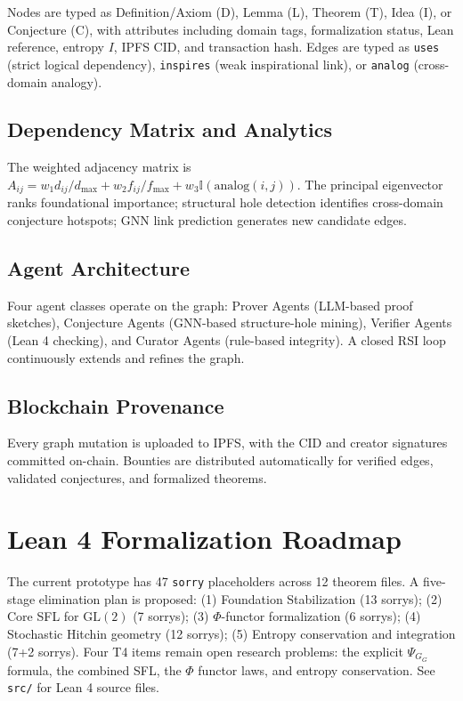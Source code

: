 \documentclass[11pt,a4paper]{article}
\theoremstyle{definition}
\newcommand{\GL}{\mathrm{GL}}
\newcommand{\PSI}{\Psi_G}
\begin{document}
Nodes are typed as Definition/Axiom (D), Lemma (L), Theorem (T), Idea (I), or Conjecture (C), with attributes including domain tags, formalization status, Lean reference, entropy $I$, IPFS CID, and transaction hash. Edges are typed as \texttt{uses} (strict logical dependency), \texttt{inspires} (weak inspirational link), or \texttt{analog} (cross-domain analogy).

\subsection{Dependency Matrix and Analytics}

The weighted adjacency matrix is $A_{ij} = w_1 d_{ij}/d_{\max} + w_2 f_{ij}/f_{\max} + w_3 \mathbb{I}(\mathrm{analog}(i,j))$. The principal eigenvector ranks foundational importance; structural hole detection identifies cross-domain conjecture hotspots; GNN link prediction generates new candidate edges.

\subsection{Agent Architecture}

Four agent classes operate on the graph: Prover Agents (LLM-based proof sketches), Conjecture Agents (GNN-based structure-hole mining), Verifier Agents (Lean 4 checking), and Curator Agents (rule-based integrity). A closed RSI loop continuously extends and refines the graph.

\subsection{Blockchain Provenance}

Every graph mutation is uploaded to IPFS, with the CID and creator signatures committed on-chain. Bounties are distributed automatically for verified edges, validated conjectures, and formalized theorems.

\section{Lean 4 Formalization Roadmap}\label{sec:lean}

The current prototype has 47 \texttt{sorry} placeholders across 12 theorem files. A five-stage elimination plan is proposed: (1) Foundation Stabilization (13 sorrys); (2) Core SFL for $\GL(2)$ (7 sorrys); (3) $\Phi$-functor formalization (6 sorrys); (4) Stochastic Hitchin geometry (12 sorrys); (5) Entropy conservation and integration (7+2 sorrys). Four T4 items remain open research problems: the explicit $\PSI_G$ formula, the combined SFL, the $\Phi$ functor laws, and entropy conservation. See \texttt{src/} for Lean 4 source files.
\end{document}
